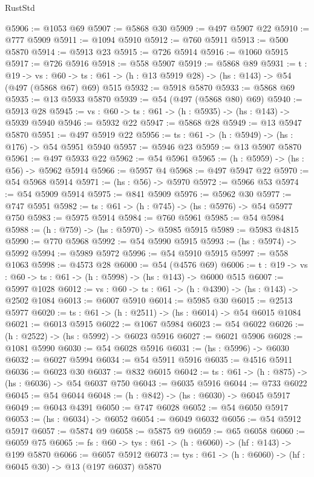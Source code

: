 \begin{lexlean}{RustStd}
\begin{coremodule}
@5906 := @1053 @69
@5907 := @5868 @30
@5909 := @497 @5907 @22
@5910 := @777 @5909
@5911 := @1094 @5910
@5912 := @760 @5911
@5913 := @500 @5870
@5914 := @5913 @23
@5915 := @726 @5914
@5916 := @1060 @5915
@5917 := @726 @5916
@5918 := @558 @5907
@5919 := @5868 @89
@5931 := {t : @19} ->
  {vs : @60} -> {ts : @61} -> (h : @13 @5919 @28) -> (hs : @143) -> @54 (@497 (@5868 @67) @69) @515
@5932 := @5918 @5870
@5933 := @5868 @69
@5935 := @13 @5933 @5870
@5939 := @54 (@497 (@5868 @80) @69)
@5940 := @5913 @28
@5945 := {vs : @60} -> {ts : @61} -> (h : @5935) -> (hs : @143) -> @5939 @5940
@5946 := @5932 @22
@5947 := @5868 @28
@5949 := @13 @5947 @5870
@5951 := @497 @5919 @22
@5956 := {ts : @61} -> (h : @5949) -> (hs : @176) -> @54 @5951 @5940
@5957 := @5946 @23
@5959 := @13 @5907 @5870
@5961 := @497 @5933 @22
@5962 := @54 @5961
@5965 := (h : @5959) -> (hs : @56) -> @5962 @5914
@5966 := @5957 @4
@5968 := @497 @5947 @22
@5970 := @54 @5968 @5914
@5971 := (hs : @56) -> @5970
@5972 := @5966 @53
@5974 := @54 @5909 @5914
@5975 := @841 @5909
@5976 := @5962 @30
@5977 := @747 @5951
@5982 := {ts : @61} -> (h : @745) -> (hs : @5976) -> @54 @5977 @750
@5983 := @5975 @5914
@5984 := @760 @5961
@5985 := @54 @5984
@5988 := (h : @759) -> (hs : @5970) -> @5985 @5915
@5989 := @5983 @4815
@5990 := @770 @5968
@5992 := @54 @5990 @5915
@5993 := (hs : @5974) -> @5992
@5994 := @5989 @5972
@5996 := @54 @5910 @5915
@5997 := @558 @1063
@5998 := @4573 @28
@6000 := @54 (@4576 @69)
@6006 := {t : @19} -> {vs : @60} -> {ts : @61} -> (h : @5998) -> (hs : @143) -> @6000 @515
@6007 := @5997 @1028
@6012 := {vs : @60} -> {ts : @61} -> (h : @4390) -> (hs : @143) -> @2502 @1084
@6013 := @6007 @5910
@6014 := @5985 @30
@6015 := @2513 @5977
@6020 := {ts : @61} -> (h : @2511) -> (hs : @6014) -> @54 @6015 @1084
@6021 := @6013 @5915
@6022 := @1067 @5984
@6023 := @54 @6022
@6026 := (h : @2522) -> (hs : @5992) -> @6023 @5916
@6027 := @6021 @5906
@6028 := @1081 @5990
@6030 := @54 @6028 @5916
@6031 := (hs : @5996) -> @6030
@6032 := @6027 @5994
@6034 := @54 @5911 @5916
@6035 := @4516 @5911
@6036 := @6023 @30
@6037 := @832 @6015
@6042 := {ts : @61} -> (h : @875) -> (hs : @6036) -> @54 @6037 @750
@6043 := @6035 @5916
@6044 := @733 @6022
@6045 := @54 @6044
@6048 := (h : @842) -> (hs : @6030) -> @6045 @5917
@6049 := @6043 @4391
@6050 := @747 @6028
@6052 := @54 @6050 @5917
@6053 := (hs : @6034) -> @6052
@6054 := @6049 @6032
@6056 := @54 @5912 @5917
@6057 := @5874 @9
@6058 := @5875 @9
@6059 := @65 @6058
@6060 := @6059 @75
@6065 := {fs : @60} -> {tys : @61} -> (h : @6060) -> (hf : @143) -> @199 @5870
@6066 := @6057 @5912
@6073 := {tys : @61} -> (h : @6060) -> (hf : @6045 @30) -> @13 (@197 @6037) @5870

\end{coremodule}
\end{lexlean}
